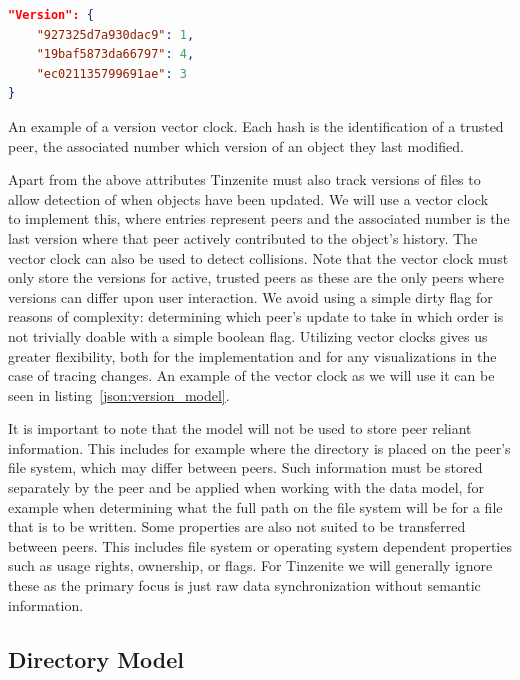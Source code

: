 \begin{listing}[htp]
    \begin{lstlisting}[language=json,firstnumber=0]
"Version": {
    "927325d7a930dac9": 1,
    "19baf5873da66797": 4,
    "ec021135799691ae": 3
}
    \end{lstlisting}
\caption[Version JSON]{An example of a version vector clock. Each hash is the identification of a trusted peer, the associated number which version of an object they last modified.}
\label{json:version_model}
\end{listing}

Apart from the above attributes Tinzenite must also track versions of files to allow detection of when objects have been updated.
We will use a vector clock~\cite{mattern1989virtual} to implement this, where entries represent peers and the associated number is the last version where that peer actively contributed to the object's history.
The vector clock can also be used to detect collisions.
Note that the vector clock must only store the versions for active, trusted peers as these are the only peers where versions can differ upon user interaction.
We avoid using a simple dirty flag for reasons of complexity: determining which peer's update to take in which order is not trivially doable with a simple boolean flag.
Utilizing vector clocks gives us greater flexibility, both for the implementation and for any visualizations in the case of tracing changes.
An example of the vector clock as we will use it can be seen in listing~\ref{json:version_model}.

It is important to note that the model will not be used to store peer reliant information.
This includes for example where the directory is placed on the peer's file system, which may differ between peers.
Such information must be stored separately by the peer and be applied when working with the data model, for example when determining what the full path on the file system will be for a file that is to be written.
Some properties are also not suited to be transferred between peers.
This includes file system or operating system dependent properties such as usage rights, ownership, or flags.
For Tinzenite we will generally ignore these as the primary focus is just raw data synchronization without semantic information.

\subsection{Directory Model}
\label{sec:dir_model}

